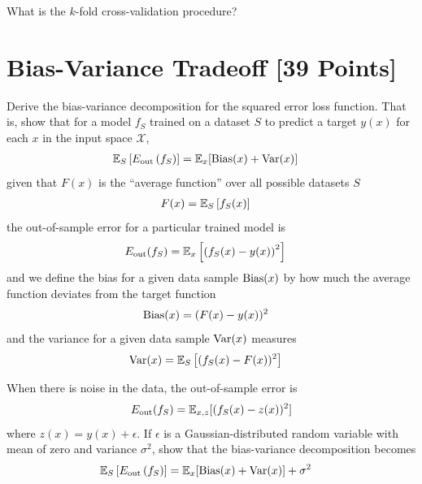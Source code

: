 \begin{problem}[2]
What is the $k$-fold cross-validation procedure?
\end{problem}
\begin{solution}

\end{solution}

\newpage
\section{Bias-Variance Tradeoff [39 Points]}

\begin{problem}[5]
Derive the bias-variance decomposition for the squared error loss function.
That is, show that for a model $f_S$ trained on a dataset $S$ to predict a target $y(x)$ for each $x$ in the input space $\mathcal{X}$,
\begin{align}
	\mathbb{E}_S \left[E_\text{out}\left(f_S\right)\right] & = \mathbb{E}_x[\operatorname{Bias}(x) + \operatorname{Var}(x)]
\end{align}
given that $F(x)$ is the ``average function'' over all possible datasets $S$
\begin{align}
	F(x) & = \mathbb{E}_S\left[f_S(x) \right]
\end{align}
the out-of-sample error for a particular trained model is
\begin{align}
	E_\text{out}(f_S) & = \mathbb{E}_x\left[\left(f_S(x) - y(x)\right)^2\right]
\end{align}
and we define the bias for a given data sample $\operatorname{Bias}(x)$ by how much the average function deviates from the target function
\begin{align}
	\operatorname{Bias}(x) & = (F(x) - y(x))^2
\end{align}
and the variance for a given data sample $\operatorname{Var}(x)$ measures
\begin{align}
	\operatorname{Var}(x) & = \mathbb{E}_S\left[(f_S(x) - F(x))^2\right]
\end{align}
\end{problem}

\begin{solution}

\end{solution}

\begin{problem}[5] When there is noise in the data, the out-of-sample error is
\begin{align}
	E_\text{out}(f_S)  = \mathbb{E}_{x,z}[(f_S(x) - z(x))^2]
\end{align}
where $z(x) = y(x) + \epsilon$.
If $\epsilon$ is a Gaussian-distributed random variable with mean of zero and variance $\sigma^2$, show that the bias-variance decomposition becomes
\begin{align}
	\mathbb{E}_S \left[E_\text{out}\left(f_S\right)\right] & = \mathbb{E}_x[\operatorname{Bias}(x) + \operatorname{Var}(x)] + \sigma^2
\end{align}
\end{problem}
\begin{solution}

\end{solution}


